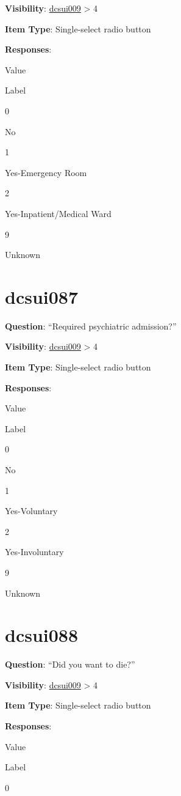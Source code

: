 \documentclass[]{book}
\begin{document}
\textbf{Visibility}: \protect\hyperlink{dcsui009}{dcsui009} \textgreater{} 4

\textbf{Item Type}: Single-select radio button

\textbf{Responses}:

Value

Label

0

No

1

Yes-Emergency Room

2

Yes-Inpatient/Medical Ward

9

Unknown

\hypertarget{dcsui087}{%
\section{dcsui087}\label{dcsui087}}

\textbf{Question}: ``Required psychiatric admission?''

\textbf{Visibility}: \protect\hyperlink{dcsui009}{dcsui009} \textgreater{} 4

\textbf{Item Type}: Single-select radio button

\textbf{Responses}:

Value

Label

0

No

1

Yes-Voluntary

2

Yes-Involuntary

9

Unknown

\hypertarget{dcsui088}{%
\section{dcsui088}\label{dcsui088}}

\textbf{Question}: ``Did you want to die?''

\textbf{Visibility}: \protect\hyperlink{dcsui009}{dcsui009} \textgreater{} 4

\textbf{Item Type}: Single-select radio button

\textbf{Responses}:

Value

Label

0
\end{document}
